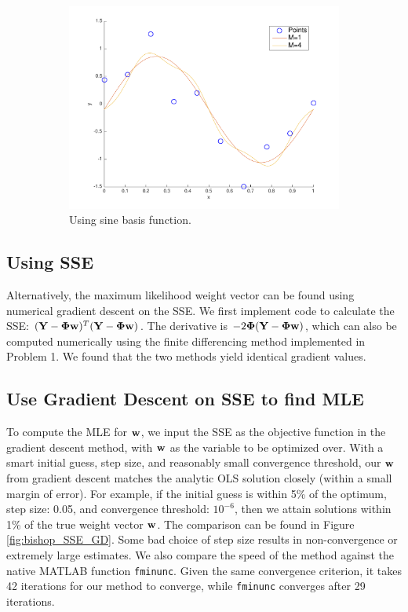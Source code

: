 \begin{figure}[h!]
\begin{subfigure}[b]{0.4\textwidth}
	\includegraphics[scale=0.4]{hw1_2_4.pdf}
	\caption{Using sine basis function.}\label{fig:bishop_sin}
    \end{subfigure}  
    \caption{}    
\end{figure}


\subsection{Using SSE}
Alternatively, the maximum likelihood weight vector can be found using numerical gradient descent on the SSE. We first implement code to calculate the SSE: $(\boldsymbol{\mathbf{Y}} - \boldsymbol{\mathbf{\Phi}} \boldsymbol{\mathbf{w}})^T(\boldsymbol{\mathbf{Y}} - \boldsymbol{\mathbf{\Phi}} \boldsymbol{\mathbf{w}})$. The derivative is $-2\boldsymbol{\mathbf{\Phi}} (\boldsymbol{\mathbf{Y}} - \boldsymbol{\mathbf{\Phi}} \boldsymbol{\mathbf{w}})$, which can also be computed numerically using the finite differencing method implemented in Problem 1. We found that the two methods yield identical gradient values.

\subsection{Use Gradient Descent on SSE to find MLE}
To compute the MLE for $\boldsymbol{\mathbf{w}}$, we input the SSE as the objective function in the gradient descent method, with $\boldsymbol{\mathbf{w}}$ as the variable to be optimized over. With a smart initial guess, step size, and reasonably small convergence threshold, our $\boldsymbol{\mathbf{w}}$ from gradient descent matches the analytic OLS solution closely (within a small margin of error). For example, if the initial guess is within 5\% of the optimum, step size: 0.05, and convergence threshold: $10^{-6}$, then we attain solutions within 1\% of the true weight vector $\boldsymbol{\mathbf{w}}$.  The comparison can be found in Figure \ref{fig:bishop_SSE_GD}. Some bad choice of step size results in non-convergence or extremely large estimates.   We also compare the speed of the method against the native MATLAB function \texttt{fminunc}.  Given the same convergence criterion, it takes 42 iterations for our method to converge, while \texttt{fminunc} converges after 29 iterations.  


